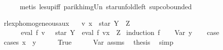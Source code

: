 \begin{isabellebody}
\ \ \ \ \isamarkupfalse%
\ {\isacharparenleft}{\kern0pt}metis\ le{\isacharunderscore}{\kern0pt}sup{\isacharunderscore}{\kern0pt}iff\ parikh{\isacharunderscore}{\kern0pt}img{\isacharunderscore}{\kern0pt}Un\ star{\isacharunderscore}{\kern0pt}unfold{\isacharunderscore}{\kern0pt}left\ sup{\isachardot}{\kern0pt}cobounded{}{\isacharparenright}{\kern0pt}\isanewline
{}\isamarkupfalse%
%
\endisatagproof
{\isafoldproof}%
%
\isadelimproof
%
\endisadelimproof
%
\isadelimdocument
%
\endisadelimdocument
%
\isatagdocument
%
\isamarkuptrue%
%
\endisatagdocument
{\isafolddocument}%
%
\isadelimdocument
%
\endisadelimdocument
%
\begin{isamarkuptext}%
\label{sec:rlexp_homogeneous}%
\end{isamarkuptext}\isamarkuptrue%
\isamarkupfalse%
\ rlexp{\isacharunderscore}{\kern0pt}homogeneous{\isacharunderscore}{\kern0pt}aux{\isacharcolon}{\kern0pt}\isanewline
\ \ \ {\isachardoublequoteopen}v\ x\ {\isacharequal}{\kern0pt}\ star\ Y\ {\isacharat}{\kern0pt}{\isacharat}{\kern0pt}\ Z{\isachardoublequoteclose}\isanewline
\ \ \ \ \ {\isachardoublequoteopen}{\isasymPsi}\ {\isacharparenleft}{\kern0pt}eval\ f\ v{\isacharparenright}{\kern0pt}\ {\isasymsubseteq}\ {\isasymPsi}\ {\isacharparenleft}{\kern0pt}star\ Y\ {\isacharat}{\kern0pt}{\isacharat}{\kern0pt}\ eval\ f\ {\isacharparenleft}{\kern0pt}v{\isacharparenleft}{\kern0pt}x\ {\isacharcolon}{\kern0pt}{\isacharequal}{\kern0pt}\ Z{\isacharparenright}{\kern0pt}{\isacharparenright}{\kern0pt}{\isacharparenright}{\kern0pt}{\isachardoublequoteclose}\isanewline
%
\isadelimproof
%
\endisadelimproof
%
\isatagproof
{}\isamarkupfalse%
\ {\isacharparenleft}{\kern0pt}induction\ f{\isacharparenright}{\kern0pt}\isanewline
\ \ \isamarkupfalse%
\ {\isacharparenleft}{\kern0pt}Var\ y{\isacharparenright}{\kern0pt}\isanewline
\ \ \isamarkupfalse%
\ {\isacharquery}{\kern0pt}case\isanewline
\ \ \isamarkupfalse%
\ {\isacharparenleft}{\kern0pt}cases\ {\isachardoublequoteopen}x\ {\isacharequal}{\kern0pt}\ y{\isachardoublequoteclose}{\isacharparenright}{\kern0pt}\isanewline
\ \ \ \ \isamarkupfalse%
\ True\isanewline
\ \ \ \ \isamarkupfalse%
\ Var\ assms\ \isamarkupfalse%
\ {\isacharquery}{\kern0pt}thesis\ \isamarkupfalse%
\ simp\isanewline

\end{isabellebody}
